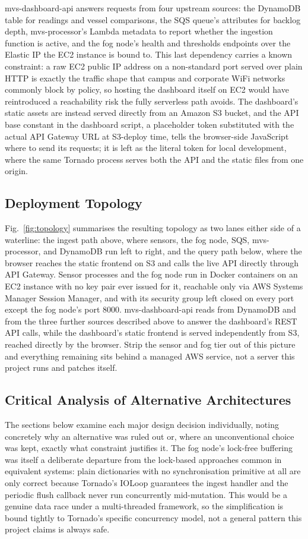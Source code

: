 \documentclass[conference]{IEEEtran}
\begin{document}
mvs-dashboard-api answers requests from four upstream sources: the DynamoDB table for readings and vessel comparisons, the SQS queue's attributes for backlog depth, mvs-processor's Lambda metadata to report whether the ingestion function is active, and the fog node's health and thresholds endpoints over the Elastic IP the EC2 instance is bound to. This last dependency carries a known constraint: a raw EC2 public IP address on a non-standard port served over plain HTTP is exactly the traffic shape that campus and corporate WiFi networks commonly block by policy, so hosting the dashboard itself on EC2 would have reintroduced a reachability risk the fully serverless path avoids. The dashboard's static assets are instead served directly from an Amazon S3 bucket, and the API base constant in the dashboard script, a placeholder token substituted with the actual API Gateway URL at S3-deploy time, tells the browser-side JavaScript where to send its requests; it is left as the literal token for local development, where the same Tornado process serves both the API and the static files from one origin.

\subsection{Deployment Topology}
Fig.~\ref{fig:topology} summarises the resulting topology as two lanes either side of a waterline: the ingest path above, where sensors, the fog node, SQS, mvs-processor, and DynamoDB run left to right, and the query path below, where the browser reaches the static frontend on S3 and calls the live API directly through API Gateway. Sensor processes and the fog node run in Docker containers on an EC2 instance with no key pair ever issued for it, reachable only via AWS Systems Manager Session Manager, and with its security group left closed on every port except the fog node's port 8000. mvs-dashboard-api reads from DynamoDB and from the three further sources described above to answer the dashboard's REST API calls, while the dashboard's static frontend is served independently from S3, reached directly by the browser. Strip the sensor and fog tier out of this picture and everything remaining sits behind a managed AWS service, not a server this project runs and patches itself.

\subsection{Critical Analysis of Alternative Architectures}
The sections below examine each major design decision individually, noting concretely why an alternative was ruled out or, where an unconventional choice was kept, exactly what constraint justifies it. The fog node's lock-free buffering was itself a deliberate departure from the lock-based approaches common in equivalent systems: plain dictionaries with no synchronisation primitive at all are only correct because Tornado's IOLoop guarantees the ingest handler and the periodic flush callback never run concurrently mid-mutation. This would be a genuine data race under a multi-threaded framework, so the simplification is bound tightly to Tornado's specific concurrency model, not a general pattern this project claims is always safe.
\end{document}
